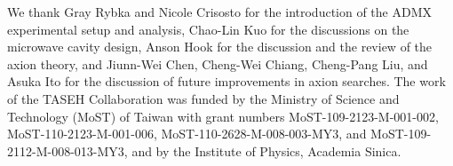\documentclass[%
preprint, %
 amsmath,amssymb,
 aps,
]{revtex4-2}
\begin{document}
\begin{acknowledgments}
We thank Gray Rybka and Nicole Crisosto for the introduction of the ADMX 
experimental 
setup and analysis, Chao-Lin Kuo for the discussions on the microwave cavity 
design, Anson Hook for the discussion and the review of the 
axion theory, and Jiunn-Wei Chen, Cheng-Wei Chiang, Cheng-Pang Liu, and 
Asuka Ito for the discussion of future improvements in axion searches.  
  The work of the TASEH Collaboration was funded by 
the Ministry of Science and Technology (MoST) of Taiwan with grant numbers 
MoST-109-2123-M-001-002, MoST-110-2123-M-001-006, MoST-110-2628-M-008-003-MY3,
and MoST-109-2112-M-008-013-MY3, and by the Institute of Physics, Academia 
Sinica. 

\end{acknowledgments}

\appendix



\end{document}
